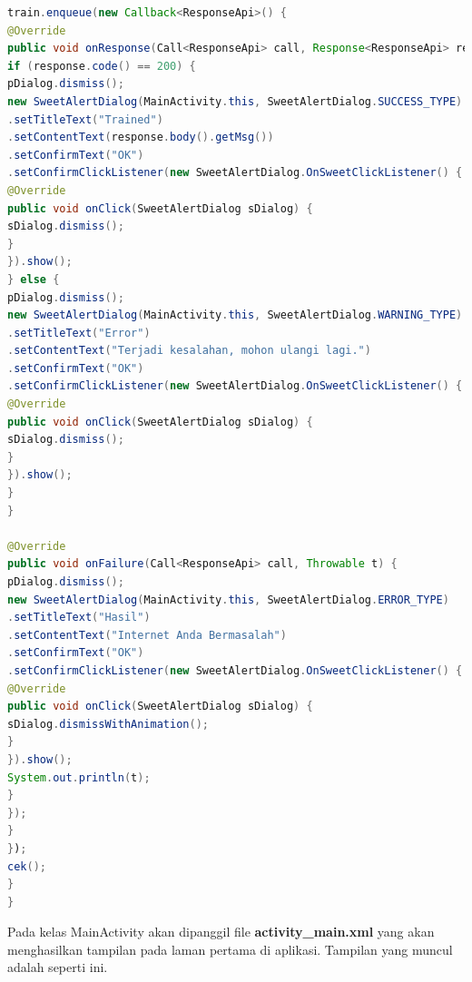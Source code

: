 \begin{lstlisting}[language=Java, caption=Implementasi Kelas Main, label=code:main, firstnumber=23]
train.enqueue(new Callback<ResponseApi>() {
@Override
public void onResponse(Call<ResponseApi> call, Response<ResponseApi> response) {
if (response.code() == 200) {
pDialog.dismiss();
new SweetAlertDialog(MainActivity.this, SweetAlertDialog.SUCCESS_TYPE)
.setTitleText("Trained")
.setContentText(response.body().getMsg())
.setConfirmText("OK")
.setConfirmClickListener(new SweetAlertDialog.OnSweetClickListener() {
@Override
public void onClick(SweetAlertDialog sDialog) {
sDialog.dismiss();
}
}).show();
} else {
pDialog.dismiss();
new SweetAlertDialog(MainActivity.this, SweetAlertDialog.WARNING_TYPE)
.setTitleText("Error")
.setContentText("Terjadi kesalahan, mohon ulangi lagi.")
.setConfirmText("OK")
.setConfirmClickListener(new SweetAlertDialog.OnSweetClickListener() {
@Override
public void onClick(SweetAlertDialog sDialog) {
sDialog.dismiss();
}
}).show();
}
}

@Override
public void onFailure(Call<ResponseApi> call, Throwable t) {
pDialog.dismiss();
new SweetAlertDialog(MainActivity.this, SweetAlertDialog.ERROR_TYPE)
.setTitleText("Hasil")
.setContentText("Internet Anda Bermasalah")
.setConfirmText("OK")
.setConfirmClickListener(new SweetAlertDialog.OnSweetClickListener() {
@Override
public void onClick(SweetAlertDialog sDialog) {
sDialog.dismissWithAnimation();
}
}).show();
System.out.println(t);
}
});
}
});
cek();
}
}
\end{lstlisting}
\par Pada kelas MainActivity akan dipanggil file \textbf{activity\_main.xml} yang akan menghasilkan tampilan pada laman pertama di aplikasi. Tampilan yang muncul adalah seperti ini.
